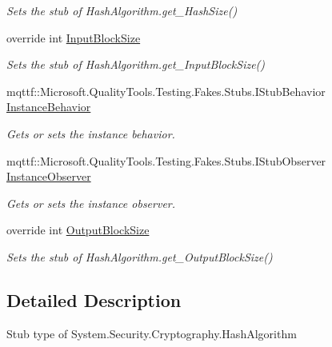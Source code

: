 \begin{DoxyCompactItemize}
\begin{DoxyCompactList}\small\item\em Sets the stub of Hash\-Algorithm.\-get\-\_\-\-Hash\-Size()\end{DoxyCompactList}\item 
override int \hyperlink{class_system_1_1_security_1_1_cryptography_1_1_fakes_1_1_stub_hash_algorithm_a43bd95133f2c4fedbd5c439b47dd12a3}{Input\-Block\-Size}
\begin{DoxyCompactList}\small\item\em Sets the stub of Hash\-Algorithm.\-get\-\_\-\-Input\-Block\-Size()\end{DoxyCompactList}\item 
mqttf\-::\-Microsoft.\-Quality\-Tools.\-Testing.\-Fakes.\-Stubs.\-I\-Stub\-Behavior \hyperlink{class_system_1_1_security_1_1_cryptography_1_1_fakes_1_1_stub_hash_algorithm_a0f09e7ae8feb4fd7329f508b00222b47}{Instance\-Behavior}
\begin{DoxyCompactList}\small\item\em Gets or sets the instance behavior.\end{DoxyCompactList}\item 
mqttf\-::\-Microsoft.\-Quality\-Tools.\-Testing.\-Fakes.\-Stubs.\-I\-Stub\-Observer \hyperlink{class_system_1_1_security_1_1_cryptography_1_1_fakes_1_1_stub_hash_algorithm_a0873fb0c75120d84a9b4d196f9a3dfc0}{Instance\-Observer}
\begin{DoxyCompactList}\small\item\em Gets or sets the instance observer.\end{DoxyCompactList}\item 
override int \hyperlink{class_system_1_1_security_1_1_cryptography_1_1_fakes_1_1_stub_hash_algorithm_a29a5453081b7ff8124b0153450989612}{Output\-Block\-Size}
\begin{DoxyCompactList}\small\item\em Sets the stub of Hash\-Algorithm.\-get\-\_\-\-Output\-Block\-Size()\end{DoxyCompactList}\end{DoxyCompactItemize}


\subsection{Detailed Description}
Stub type of System.\-Security.\-Cryptography.\-Hash\-Algorithm



